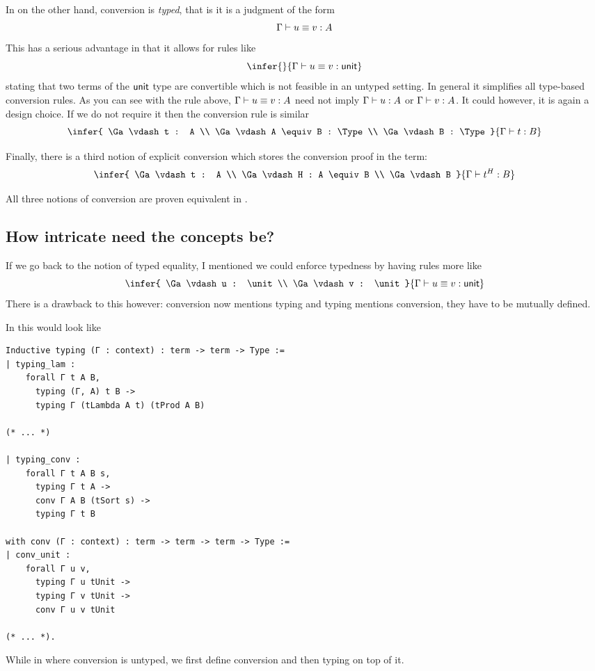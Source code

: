 In \Agda on the other hand, conversion is \emph{typed}, that is it is a judgment
of the form
\[
  \Gamma \vdash u \equiv v : A
\]
This has a serious advantage in that it allows for rules like
\[
  \infer
    { }
    {\Ga \vdash u \equiv v : \unit}
\]
stating that two terms of the \(\mathsf{unit}\) type are convertible which is not
feasible in an untyped setting. In general it simplifies all type-based
conversion rules. As you can see with the rule above,
\(\Gamma \vdash u \equiv v : A\) need not imply \(\Gamma \vdash u : A\) or
\(\Gamma \vdash v : A\). It could however, it is again a design choice.
If we do not require it then the conversion rule is similar
\[
  \infer
    {
      \Ga \vdash t : A \\
      \Ga \vdash A \equiv B : \Type \\
      \Ga \vdash B : \Type
    }
    {\Ga \vdash t : B}
\]

Finally, there is a third notion of explicit conversion which stores the
conversion proof in the term:
\[
  \infer
    {
      \Ga \vdash t : A \\
      \Ga \vdash H : A \equiv B \\
      \Ga \vdash B
    }
    {\Ga \vdash t^H : B}
\]

All three notions of conversion are proven equivalent in
.

\subsection{How intricate need the concepts be?}

If we go back to the notion of typed equality, I mentioned we could enforce
typedness by having rules more like
\[
  \infer
    {
      \Ga \vdash u : \unit \\
      \Ga \vdash v : \unit
    }
    {\Ga \vdash u \equiv v : \unit}
\]
There is a drawback to this however: conversion now mentions typing and typing
mentions conversion, they have to be mutually defined.

In \Coq this would look like
\begin{verbatim}
Inductive typing (Γ : context) : term -> term -> Type :=
| typing_lam :
    forall Γ t A B,
      typing (Γ, A) t B ->
      typing Γ (tLambda A t) (tProd A B)

(* ... *)

| typing_conv :
    forall Γ t A B s,
      typing Γ t A ->
      conv Γ A B (tSort s) ->
      typing Γ t B

with conv (Γ : context) : term -> term -> term -> Type :=
| conv_unit :
    forall Γ u v,
      typing Γ u tUnit ->
      typing Γ v tUnit ->
      conv Γ u v tUnit

(* ... *).
\end{verbatim}
While in \MetaCoq where conversion is untyped, we first define conversion
and then typing on top of it.

